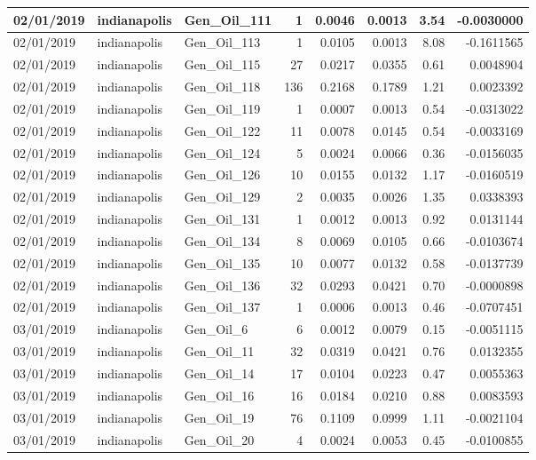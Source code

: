 \documentclass[
  letterpaper,
  DIV=11,
  numbers=noendperiod]{scrartcl}
\begin{document}
\begin{tabular}{l|l|l|r|r|r|r|r}
\hline
02/01/2019 & indianapolis & Gen\_Oil\_111 & 1 & 0.0046 & 0.0013 & 3.54 & -0.0030000\\
\hline
02/01/2019 & indianapolis & Gen\_Oil\_113 & 1 & 0.0105 & 0.0013 & 8.08 & -0.1611565\\
\hline
02/01/2019 & indianapolis & Gen\_Oil\_115 & 27 & 0.0217 & 0.0355 & 0.61 & 0.0048904\\
\hline
02/01/2019 & indianapolis & Gen\_Oil\_118 & 136 & 0.2168 & 0.1789 & 1.21 & 0.0023392\\
\hline
02/01/2019 & indianapolis & Gen\_Oil\_119 & 1 & 0.0007 & 0.0013 & 0.54 & -0.0313022\\
\hline
02/01/2019 & indianapolis & Gen\_Oil\_122 & 11 & 0.0078 & 0.0145 & 0.54 & -0.0033169\\
\hline
02/01/2019 & indianapolis & Gen\_Oil\_124 & 5 & 0.0024 & 0.0066 & 0.36 & -0.0156035\\
\hline
02/01/2019 & indianapolis & Gen\_Oil\_126 & 10 & 0.0155 & 0.0132 & 1.17 & -0.0160519\\
\hline
02/01/2019 & indianapolis & Gen\_Oil\_129 & 2 & 0.0035 & 0.0026 & 1.35 & 0.0338393\\
\hline
02/01/2019 & indianapolis & Gen\_Oil\_131 & 1 & 0.0012 & 0.0013 & 0.92 & 0.0131144\\
\hline
02/01/2019 & indianapolis & Gen\_Oil\_134 & 8 & 0.0069 & 0.0105 & 0.66 & -0.0103674\\
\hline
02/01/2019 & indianapolis & Gen\_Oil\_135 & 10 & 0.0077 & 0.0132 & 0.58 & -0.0137739\\
\hline
02/01/2019 & indianapolis & Gen\_Oil\_136 & 32 & 0.0293 & 0.0421 & 0.70 & -0.0000898\\
\hline
02/01/2019 & indianapolis & Gen\_Oil\_137 & 1 & 0.0006 & 0.0013 & 0.46 & -0.0707451\\
\hline
03/01/2019 & indianapolis & Gen\_Oil\_6 & 6 & 0.0012 & 0.0079 & 0.15 & -0.0051115\\
\hline
03/01/2019 & indianapolis & Gen\_Oil\_11 & 32 & 0.0319 & 0.0421 & 0.76 & 0.0132355\\
\hline
03/01/2019 & indianapolis & Gen\_Oil\_14 & 17 & 0.0104 & 0.0223 & 0.47 & 0.0055363\\
\hline
03/01/2019 & indianapolis & Gen\_Oil\_16 & 16 & 0.0184 & 0.0210 & 0.88 & 0.0083593\\
\hline
03/01/2019 & indianapolis & Gen\_Oil\_19 & 76 & 0.1109 & 0.0999 & 1.11 & -0.0021104\\
\hline
03/01/2019 & indianapolis & Gen\_Oil\_20 & 4 & 0.0024 & 0.0053 & 0.45 & -0.0100855\\

\end{tabular}
\end{document}
